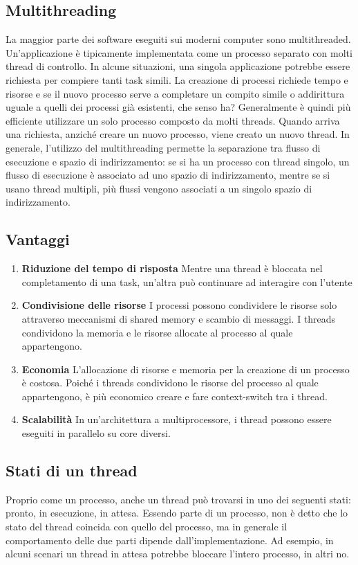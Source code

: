 \documentclass[a4paper]{article}
\begin{document}
\subsection{Multithreading}
La maggior parte dei software eseguiti sui moderni computer sono multithreaded. Un'applicazione è tipicamente implementata come un processo separato con molti thread di controllo. In alcune situazioni, una singola applicazione potrebbe essere richiesta per compiere tanti task simili. La creazione di processi richiede tempo e risorse e se il nuovo processo serve a completare un compito simile o addirittura uguale a quelli dei processi già esistenti, che senso ha? Generalmente è quindi più efficiente utilizzare un solo processo composto da molti threads. Quando arriva una richiesta, anziché creare un nuovo processo, viene creato un nuovo thread. In generale, l'utilizzo del multithreading permette la separazione tra flusso di esecuzione e spazio di indirizzamento: se si ha un processo con thread singolo, un flusso di esecuzione è associato ad uno spazio di indirizzamento, mentre se si usano thread multipli, più flussi vengono associati a un singolo spazio di indirizzamento.

\subsection{Vantaggi}
\begin{enumerate}
    \item \textbf{Riduzione del tempo di risposta} Mentre una thread è bloccata nel completamento di una task, un'altra può continuare ad interagire con l'utente
    \item \textbf{Condivisione delle risorse} I processi possono condividere le risorse solo attraverso meccanismi di shared memory e scambio di messaggi. I threads condividono la memoria e le risorse allocate al processo al quale appartengono.
    \item \textbf{Economia} L'allocazione di risorse e memoria per la creazione di un processo è costosa. Poiché i threads condividono le risorse del processo al quale appartengono, è più economico creare e fare context-switch tra i thread.
    \item \textbf{Scalabilità} In un'architettura a multiprocessore, i thread possono essere eseguiti in parallelo su core diversi.
\end{enumerate}

\subsection{Stati di un thread}
Proprio come un processo, anche un thread può trovarsi in uno dei seguenti stati: pronto, in esecuzione, in attesa. Essendo parte di un processo, non è detto che lo stato del thread coincida con quello del processo, ma in generale il comportamento delle due parti dipende dall'implementazione. Ad esempio, in alcuni scenari un thread in attesa potrebbe bloccare l'intero processo, in altri no.
\end{document}
